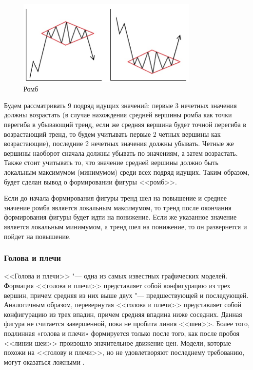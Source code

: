 \documentclass[bachelor, och, coursework]{SCWorks}
\begin{document}
    \begin{figure}[H]
        \centering
        \includegraphics[width=0.8\textwidth]{pic/rhombuses.jpg}
        \caption{Ромб}
    \end{figure}
   
    Будем рассматривать 9 подряд идущих значений: первые 3 нечетных значения
    должны возрастать (в случае нахождения средней вершины ромба как точки
    перегиба в убывающий тренд, если же средняя вершина будет точной перегиба в
    возрастающий тренд, то будем учитывать первые 2 четных вершины как
    возрастающие), последние 2 нечетных значения должны убывать. Четные же
    вершины наоборот сначала должны убывать по значениям, а затем возрастать.
    Также стоит учитывать то, что значение средней вершины должно быть локальным
    максимумом (минимумом) среди всех подряд идущих. Таким образом, будет сделан
    вывод о формировании фигуры <<ромб>>.

    Если до начала формирования фигуры тренд шел на повышение и среднее значение
    ромба является локальным максимумом, то тренд после окончания формирования
    фигуры будет идти на понижение. Если же указанное значение является
    локальным минимумом, а тренд шел на понижение, то он развернется и пойдет на
    повышение.

    \subsubsection{Голова и плечи}
    <<Голова и плечи>> "--- одна из самых известных графических моделей.
    Формация <<голова и плечи>> представляет собой конфигурацию из трех вершин,
    причем средняя из них выше двух "--- предшествующей и последующей.
    Аналогичным образом, перевернутая <<голова и плечи>> представляет собой
    конфигурацию из трех впадин, причем средняя впадина ниже соседних. Данная
    фигура не считается завершенной, пока не пробита линия <<шеи>>. Более того,
    подлинная «голова и плечи» формируется только после того, как после пробоя
    <<линии шеи>> произошло значительное движение цен. Модели, которые похожи на
    <<голову и плечи>>, но не удовлетворяют последнему требованию, могут
    оказаться ложными \cite{colby2003encyclopedia}.
    
\end{document}
